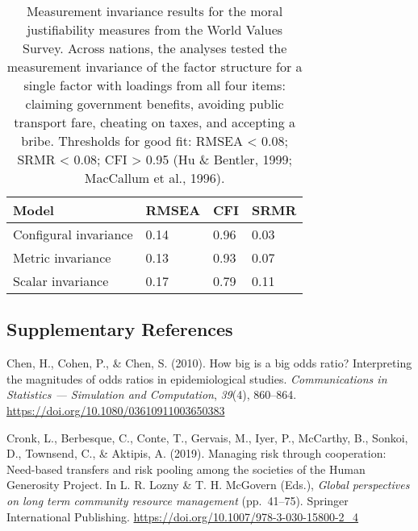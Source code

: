 \documentclass[
  man,floatsintext]{apa6}
\begin{document}
\newpage



\begin{table}[h]

\begin{center}
\begin{threeparttable}

\caption{\label{tab:tableInvarianceWVS2}Measurement invariance results for the moral justifiability measures from the World Values Survey. Across nations, the analyses tested the measurement invariance of the factor structure for a single factor with loadings from all four items: claiming government benefits, avoiding public transport fare, cheating on taxes, and accepting a bribe. Thresholds for good fit: RMSEA \textless{} 0.08; SRMR \textless{} 0.08; CFI \textgreater{} 0.95 (Hu \& Bentler, 1999; MacCallum et al., 1996).}

\begin{tabular}{m{4cm}m{3cm}m{3cm}m{3cm}}
\toprule
Model & \multicolumn{1}{c}{RMSEA} & \multicolumn{1}{c}{CFI} & \multicolumn{1}{c}{SRMR}\\
\midrule
Configural invariance & 0.14 & 0.96 & 0.03\\
Metric invariance & 0.13 & 0.93 & 0.07\\
Scalar invariance & 0.17 & 0.79 & 0.11\\
\bottomrule
\end{tabular}

\end{threeparttable}
\end{center}

\end{table}

\newpage

\hypertarget{supplementary-references}{%
\subsection{Supplementary References}\label{supplementary-references}}

Chen, H., Cohen, P., \& Chen, S. (2010). How big is a big odds ratio? Interpreting the magnitudes of odds ratios in epidemiological studies. \emph{Communications in Statistics --- Simulation and Computation}, \emph{39}(4), 860--864. \url{https://doi.org/10.1080/03610911003650383}

Cronk, L., Berbesque, C., Conte, T., Gervais, M., Iyer, P., McCarthy, B., Sonkoi, D., Townsend, C., \& Aktipis, A. (2019). Managing risk through cooperation: Need-based transfers and risk pooling among the societies of the Human Generosity Project. In L. R. Lozny \& T. H. McGovern (Eds.), \emph{Global perspectives on long term community resource management} (pp.~41--75). Springer International Publishing. \url{https://doi.org/10.1007/978-3-030-15800-2_4}
\end{document}

